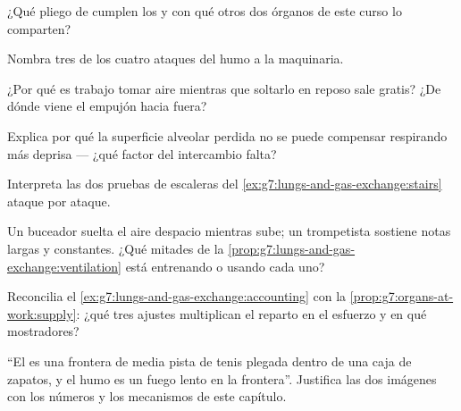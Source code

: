 \begin{exercise}[$\star$]\label{exo:g7:lungs-and-gas-exchange:5}
¿Qué pliego de  cumplen los  y con qué otros dos
órganos de este curso lo comparten?
\end{exercise}

\begin{exercise}[$\star$]\label{exo:g7:lungs-and-gas-exchange:6}
Nombra tres de los cuatro ataques del humo a la maquinaria.
\end{exercise}

\begin{exercise}[$\star\star$]\label{exo:g7:lungs-and-gas-exchange:7}
¿Por qué es trabajo tomar aire mientras que soltarlo en reposo sale
gratis? ¿De dónde viene el empujón hacia fuera?
\end{exercise}

\begin{exercise}[$\star\star$]\label{exo:g7:lungs-and-gas-exchange:8}
Explica por qué la superficie alveolar perdida no se puede compensar
respirando más deprisa --- ¿qué factor del intercambio falta?
\end{exercise}

\begin{exercise}[$\star\star$]\label{exo:g7:lungs-and-gas-exchange:9}
Interpreta las dos pruebas de escaleras del
\cref{ex:g7:lungs-and-gas-exchange:stairs} ataque por ataque.
\end{exercise}

\begin{exercise}[$\star\star$]\label{exo:g7:lungs-and-gas-exchange:10}
Un buceador suelta el aire despacio mientras sube; un trompetista
sostiene notas largas y constantes. ¿Qué mitades de la
\cref{prop:g7:lungs-and-gas-exchange:ventilation} está entrenando o
usando cada uno?
\end{exercise}

\begin{exercise}[$\star\star$]\label{exo:g7:lungs-and-gas-exchange:11}
Reconcilia el \cref{ex:g7:lungs-and-gas-exchange:accounting} con la
\cref{prop:g7:organs-at-work:supply}: ¿qué tres ajustes multiplican el
reparto en el esfuerzo y en qué mostradores?
\end{exercise}

\begin{exercise}[$\star\star\star$]\label{exo:g7:lungs-and-gas-exchange:12}
``El  es una frontera de media pista de tenis plegada dentro de
una caja de zapatos, y el humo es un fuego lento en la frontera''.
Justifica las dos imágenes con los números y los mecanismos de este
capítulo.
\end{exercise}


